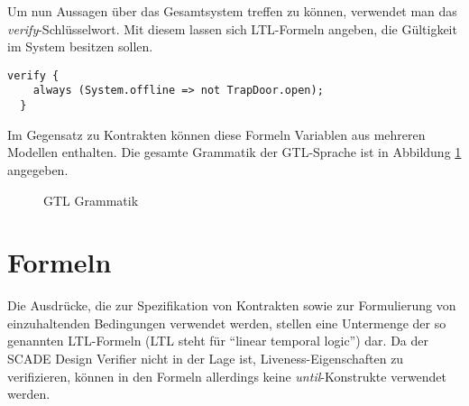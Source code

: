 Um nun Aussagen über das Gesamtsystem treffen zu können, verwendet man das \emph{verify}-Schlüsselwort.
Mit diesem lassen sich LTL-Formeln angeben, die Gültigkeit im System besitzen sollen.
\begin{lstlisting}[language=gtl]
  verify {
    always (System.offline => not TrapDoor.open);
  }
\end{lstlisting}
Im Gegensatz zu Kontrakten können diese Formeln Variablen aus mehreren Modellen enthalten.
Die gesamte Grammatik der GTL-Sprache ist in Abbildung \ref{fig:grammar} angegeben.

\begin{figure}
  \centering
  
  \caption{GTL Grammatik}
  \label{fig:grammar}
\end{figure}

\section{Formeln}
Die Ausdrücke, die zur Spezifikation von Kontrakten sowie zur Formulierung von einzuhaltenden Bedingungen verwendet werden, stellen eine Untermenge der so genannten LTL-Formeln (LTL steht für "`linear temporal logic"') dar.
Da der SCADE Design Verifier nicht in der Lage ist, Liveness-Eigenschaften zu verifizieren, können in den Formeln allerdings keine \emph{until}-Konstrukte verwendet werden.





